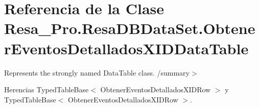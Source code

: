\section{Referencia de la Clase Resa\+\_\+\+Pro.\+Resa\+D\+B\+Data\+Set.\+Obtener\+Eventos\+Detallados\+X\+I\+D\+Data\+Table}
\label{class_resa___pro_1_1_resa_d_b_data_set_1_1_obtener_eventos_detallados_x_i_d_data_table}


Represents the strongly named Data\+Table class. /summary$>$  




Herencias Typed\+Table\+Base$<$ Obtener\+Eventos\+Detallados\+X\+I\+D\+Row $>$ y Typed\+Table\+Base$<$ Obtener\+Eventos\+Detallados\+X\+I\+D\+Row $>$.

